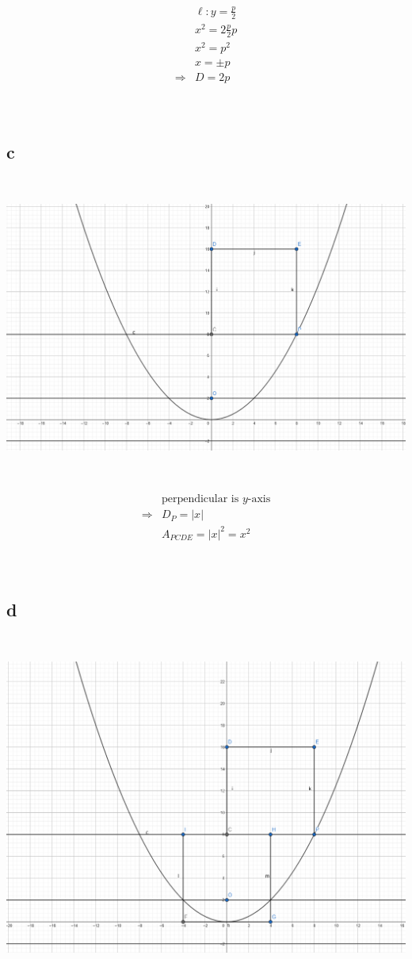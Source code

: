 \documentclass{article}
\begin{document}
~

\begin{align*}
    &\ell :y=\frac{p}{2}\\
    &x^2=2\frac{p}{2}p\\
    &x^2=p^2\\
    &x=\pm p\\
    \Rightarrow&D=2p\\
\end{align*}

~

\subsection*{c}

~

\includegraphics[scale=0.3]{HW_0307/3c.png}

~

\begin{align*}
    &\text{perpendicular is }y\text{-axis}\\
    \Rightarrow&D_P=|x|\\
    &A_{PCDE}=|x|^2=x^2\\
\end{align*}

~

\subsection*{d}

~

\includegraphics[scale=0.3]{HW_0307/3d.png}
\end{document}

